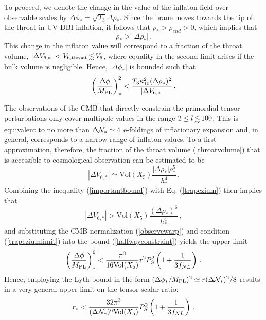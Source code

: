 To proceed, we denote the change in the value of the inflaton field over 
observable scales by 
$\Delta  \phi _{*} = \sqrt{T_3} \Delta \rho_{*}$. 
Since the brane moves towards the tip of the throat in 
UV DBI inflation, it follows that $\rho_{*} > \rho_{end} >0$, which 
implies that  
\begin{equation}
\label{importantbound}
\rho_{*} > |\Delta \rho _{*}| \,.
\end{equation}
This change in the inflaton value will correspond 
to a fraction of the throat volume, 
$| \Delta V _{6,*}|  < {V_{6,\mathrm{throat}}} \, \lsim \, {V_6} $,
where equality in the second limit arises if
the bulk volume is negligible. Hence, 
$| \Delta \phi_* |$ is bounded such that  
\begin{equation}
\label{halfwayconstraint}
\left( \frac{\Delta \phi}{M_{\mathrm{PL}}} \right)^2_{*} < 
\frac{T_3 \kappa_{10}^2 (\Delta \rho_{*})^2}{|\Delta V_{6,*}|} \,.
\end{equation} 

The observations of the CMB 
that directly constrain the primordial tensor perturbations only 
cover multipole values in the range $2 \le l \, \lsim \, 100$. 
This is equivalent to no more than ${\Delta {\cal{N}}_{*}} \simeq {4}$ 
e-foldings of inflationary expansion and, in general,   
corresponds to a narrow range of inflaton values. 
To a first approximation, therefore, the fraction of the throat volume 
(\ref{throatvolume}) that is accessible to cosmological 
observation can be estimated to be 
\begin{equation}
\label{trapezium}
| \Delta V_{6,*} | \simeq \mathrm{Vol}(X_5) 
\frac{|\Delta \rho_*| \rho^5_{*}}{h^{4}_{*}} \,.
\end{equation}
Combining the inequality (\ref{importantbound}) with Eq. (\ref{trapezium}) 
then implies that 
\begin{equation}
\label{trapeziumlimit}
|\Delta V _{6,*}| > \mathrm{Vol}(X_5) 
\frac{(\Delta \rho_* )^6}{h^{4}_*}  \,,
\end{equation}
and substituting the CMB normalization (\ref{observewarp}) and 
condition (\ref{trapeziumlimit}) into the bound (\ref{halfwayconstraint}) 
yields the upper limit   
\begin{equation}
\label{boundpower6}
\left( \frac{\Delta \phi}{M_{\mathrm{PL}}} \right)^6_{*} 
< \frac{\pi^3}{16\mathrm{Vol}(X_5)} r^2 P_S^2 
\left( 1+ \frac{1}{3f_{NL}} \right)  \,.
\end{equation}
Hence, employing the Lyth bound in the form $(\Delta \phi_* / M_{\mathrm{PL}} )^2 \simeq 
r (\Delta {\cal{N}}_*)^2 /8$  
results in a very general upper limit on the tensor-scalar ratio: 
\begin{equation}
\label{generalbound}
r_{*} < \frac{32 \pi^3}{(\Delta {\cal{N}}_*)^6 \mathrm{Vol}(X_5)} 
P_S^2 \left( 1+ \frac{1}{3f_{NL}} \right) \,.
\end{equation}

